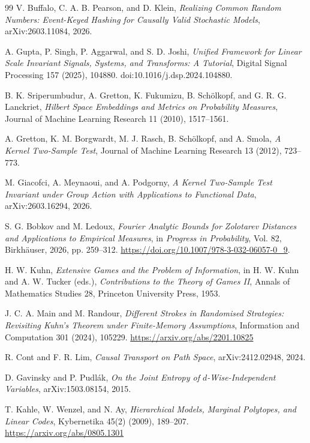 \documentclass[11pt,a4paper]{article}
\newcommand{\1}{\mathbf 1}
\begin{document}
\begin{thebibliography}{99}
V. Buffalo, C. A. B. Pearson, and D. Klein,
\emph{Realizing Common Random Numbers:
Event-Keyed Hashing for Causally Valid Stochastic Models},
arXiv:2603.11084, 2026.

A. Gupta, P. Singh, P. Aggarwal, and S. D. Joshi,
\emph{Unified Framework for Linear Scale Invariant Signals, Systems,
and Transforms: A Tutorial},
Digital Signal Processing 157 (2025), 104880.
doi:10.1016/j.dsp.2024.104880.

B. K. Sriperumbudur, A. Gretton, K. Fukumizu, B. Schölkopf,
and G. R. G. Lanckriet,
\emph{Hilbert Space Embeddings and Metrics on Probability Measures},
Journal of Machine Learning Research 11 (2010), 1517--1561.

A. Gretton, K. M. Borgwardt, M. J. Rasch, B. Schölkopf, and A. Smola,
\emph{A Kernel Two-Sample Test},
Journal of Machine Learning Research 13 (2012), 723--773.

M. Giacofci, A. Meynaoui, and A. Podgorny,
\emph{A Kernel Two-Sample Test Invariant under Group Action with
Applications to Functional Data},
arXiv:2603.16294, 2026.

S. G. Bobkov and M. Ledoux,
\emph{Fourier Analytic Bounds for Zolotarev Distances and Applications
to Empirical Measures},
in \emph{Progress in Probability}, Vol. 82,
Birkhäuser, 2026, pp. 259--312.
\url{https://doi.org/10.1007/978-3-032-06057-0_9}.

H. W. Kuhn,
\emph{Extensive Games and the Problem of Information},
in H. W. Kuhn and A. W. Tucker (eds.),
\emph{Contributions to the Theory of Games II},
Annals of Mathematics Studies 28,
Princeton University Press, 1953.

J. C. A. Main and M. Randour,
\emph{Different Strokes in Randomised Strategies:
Revisiting Kuhn's Theorem under Finite-Memory Assumptions},
Information and Computation 301 (2024), 105229.
\url{https://arxiv.org/abs/2201.10825}

R. Cont and F. R. Lim,
\emph{Causal Transport on Path Space},
arXiv:2412.02948, 2024.

D. Gavinsky and P. Pudlák,
\emph{On the Joint Entropy of $d$-Wise-Independent Variables},
arXiv:1503.08154, 2015.

T. Kahle, W. Wenzel, and N. Ay,
\emph{Hierarchical Models, Marginal Polytopes, and Linear Codes},
Kybernetika 45(2) (2009), 189--207.
\url{https://arxiv.org/abs/0805.1301}


\end{thebibliography}
\end{document}
